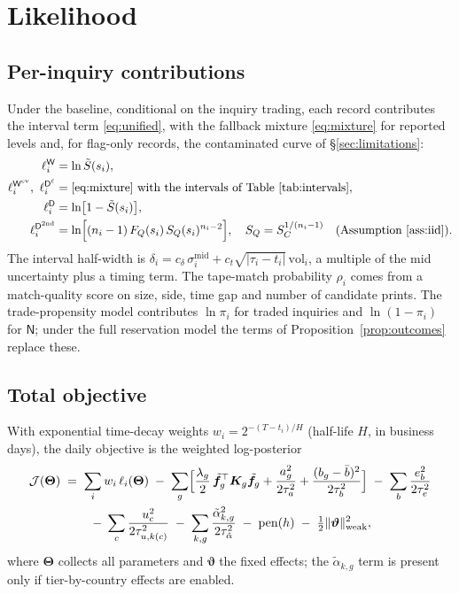 \documentclass[11pt,a4paper]{article}
\theoremstyle{definition}
\theoremstyle{remark}
\newcommand{\T}{^{\top}}
\newcommand{\bff}{\bm{f}}
\newcommand{\btheta}{\bm{\Theta}}
\newcommand{\Win}{\mathsf{W}}
\newcommand{\Wc}{\mathsf{W}^{\mathrm{cv}}}
\newcommand{\Dl}{\mathsf{D}^{\ell}}
\newcommand{\Dn}{\mathsf{D}}
\newcommand{\Dcv}{\mathsf{D}^{\mathrm{2nd}}}
\newcommand{\NT}{\mathsf{N}}
\begin{document}
\section{Likelihood}

\subsection{Per-inquiry contributions}
Under the baseline, conditional on the inquiry trading, each record contributes the interval term \eqref{eq:unified}, with the fallback mixture \eqref{eq:mixture} for reported levels and, for flag-only records, the contaminated curve of \S\ref{sec:limitations}:
\begin{align}
\ell_i^{\Win} &= \ln\tilde S(s_i), \label{eq:lW}\\
\ell_i^{\Wc},\ \ell_i^{\Dl} &= \text{\eqref{eq:mixture} with the intervals of Table~\ref{tab:intervals}}, \label{eq:lWc}\\
\ell_i^{\Dn} &= \ln\bigl[1-\tilde S(s_i)\bigr], \label{eq:lD}\\
\ell_i^{\Dcv} &= \ln\Bigl[(n_i-1)\,F_Q(s_i)\,S_Q(s_i)^{n_i-2}\Bigr],\quad S_Q=S_C^{1/(n_i-1)}\quad\text{(Assumption~\ref{ass:iid})}. \label{eq:lcv}
\end{align}
The interval half-width is $\delta_i=c_\delta\,\sigma^{\mathrm{mid}}_i+c_t\sqrt{|\tau_i-t_i|}\,\mathrm{vol}_i$, a multiple of the mid uncertainty plus a timing term. The tape-match probability $\rho_i$ comes from a match-quality score on size, side, time gap and number of candidate prints. The trade-propensity model contributes $\ln\pi_i$ for traded inquiries and $\ln(1-\pi_i)$ for $\NT$; under the full reservation model the terms of Proposition~\ref{prop:outcomes} replace these.

\subsection{Total objective}
With exponential time-decay weights $w_i=2^{-(T-t_i)/H}$ (half-life $H$, in business days), the daily objective is the weighted log-posterior
\begin{multline}\label{eq:objective}
\mathcal{J}(\btheta)\;=\;\sum_{i}w_i\,\ell_i(\btheta)
\;-\;\sum_g\Bigl[\frac{\lambda_g}{2}\,\tilde{\bff}_g\T\bm K_g\tilde{\bff}_g+\frac{a_g^2}{2\tau_a^2}+\frac{(b_g-\bar b)^2}{2\tau_b^2}\Bigr]
\;-\;\sum_b\frac{e_b^2}{2\tau_e^2}\\
\;-\;\sum_c\frac{u_c^2}{2\tau_{u,k(c)}^2}\;-\;\sum_{k,g}\frac{\tilde\alpha_{k,g}^2}{2\tau_{\tilde\alpha}^2}\;-\;\mathrm{pen}(h)\;-\;\tfrac12\|\bm\vartheta\|^2_{\mathrm{weak}},
\end{multline}
where $\btheta$ collects all parameters and $\bm\vartheta$ the fixed effects; the $\tilde\alpha_{k,g}$ term is present only if tier-by-country effects are enabled.
\end{document}
